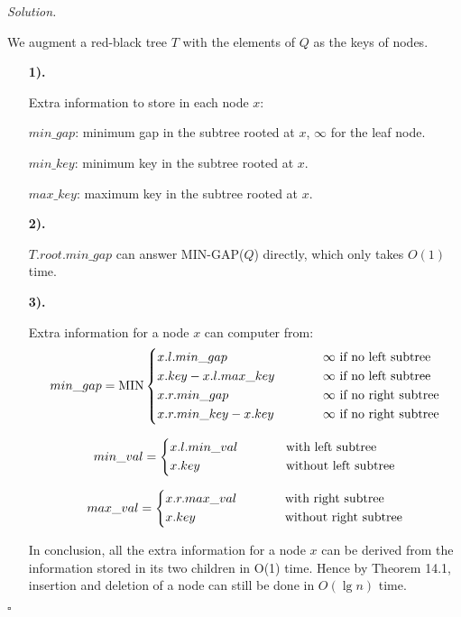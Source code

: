 \documentclass[11pt]{article}
\theoremstyle{definition}
\newenvironment{solution}{\noindent\emph{Solution.}}{\hfill$\square$}
\newcommand\tab[1][1cm]{\hspace*{#1}}
\begin{document}
\begin{solution}

We augment a red-black tree $T$ with the elements of $Q$ as the keys of nodes.

\begin{enumerate}



   \item[\textbf{1).}]

Extra information to store in each node $x$:

\tab $min\_gap$: minimum gap in the subtree rooted at $x$, $\infty$ for the leaf node.

\tab $min\_key$: minimum key in the subtree rooted at $x$.

\tab $max\_key$: maximum key in the subtree rooted at $x$.

   \item[\textbf{2).}]
   
   $T.root.min\_gap$ can answer MIN-GAP($Q$) directly, which only takes $O(1)$ time.
   
   \item[\textbf{3).}]
   
   Extra information for a node $x$ can computer from:
   $$
   min\_gap = \mbox{MIN} \left \{
   \begin{aligned}
   &x.l.min\_gap \tab & &\infty\ \mbox{if no left subtree} \\
   &x.key -  x.l.max\_key  \tab & &\infty\ \mbox{if no left subtree} \\
   &x.r.min\_gap \tab & &\infty\ \mbox{if no right subtree} \\   
   &x.r.min\_key - x.key  \tab & &\infty\ \mbox{if no right subtree} 
   \end{aligned}
   \right.
   $$
   
   $$
   min\_val =  \left \{
   \begin{aligned}
   &x.l.min\_val \tab & &\mbox{with left subtree} \\
   &x.key    \tab & &\mbox{without left subtree} \\
   \end{aligned}
   \right.
   $$
   
   $$
   max\_val =  \left \{
   \begin{aligned}
   &x.r.max\_val \tab & &\mbox{with right subtree} \\
   &x.key    \tab & &\mbox{without right subtree} \\
   \end{aligned}
   \right.
   $$
   
   In conclusion, all the extra information for a node $x$ can be derived from the information stored in its two children in O(1) time. Hence by Theorem 14.1, insertion and deletion of a node can still be done in $O(\lg n)$ time.
   
 





\end{enumerate}


\end{solution}
\end{document}
